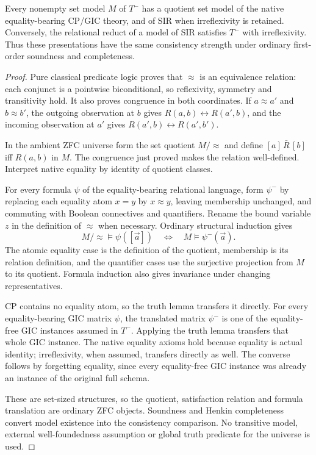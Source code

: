 \begin{theorem}
\label{thm:kstwin}
Every nonempty set model $M$ of $T^-$ has a quotient set model of the
native equality-bearing CP/GIC theory, and of SIR when irreflexivity
is retained. Conversely, the relational reduct of a model of SIR
satisfies $T^-$ with irreflexivity. Thus these presentations have the
same consistency strength under ordinary first-order soundness and
completeness.
\end{theorem}
\begin{proof}
Pure classical predicate logic proves that $\approx$ is an equivalence
relation: each conjunct is a pointwise biconditional, so reflexivity,
symmetry and transitivity hold. It also proves congruence in both
coordinates. If $a\approx a'$ and $b\approx b'$, the outgoing
observation at $b$ gives $R(a,b)\leftrightarrow R(a',b)$, and the
incoming observation at $a'$ gives
$R(a',b)\leftrightarrow R(a',b')$.

In the ambient ZFC universe form the set quotient $M/{\approx}$ and
define $[a]\,\bar R\,[b]$ iff $R(a,b)$ in $M$. The congruence just
proved makes the relation well-defined. Interpret native equality by
identity of quotient classes.

For every formula $\psi$ of the equality-bearing relational language,
form $\psi^-$ by replacing each equality atom $x=y$ by $x\approx y$,
leaving membership unchanged, and commuting with Boolean connectives
and quantifiers. Rename the bound variable $z$ in the definition of
$\approx$ when necessary. Ordinary structural induction gives
\[
 M/{\approx}\models\psi([\vec a])
 \quad\Longleftrightarrow\quad M\models\psi^-(\vec a).
\]
The atomic equality case is the definition of the quotient, membership
is its relation definition, and the quantifier cases use the surjective
projection from $M$ to its quotient. Formula induction also gives
invariance under changing representatives.

CP contains no equality atom, so the truth lemma transfers it directly.
For every equality-bearing GIC matrix $\psi$, the translated matrix
$\psi^-$ is one of the equality-free GIC instances assumed in $T^-$.
Applying the truth lemma transfers that whole GIC instance. The native
equality axioms hold because equality is actual identity; irreflexivity,
when assumed, transfers directly as well. The converse follows by
forgetting equality, since every equality-free GIC instance was already
an instance of the original full schema.

These are set-sized structures, so the quotient, satisfaction relation
and formula translation are ordinary ZFC objects. Soundness and Henkin
completeness convert model existence into the consistency comparison.
No transitive model, external well-foundedness assumption or global
truth predicate for the universe is used.
\end{proof}

